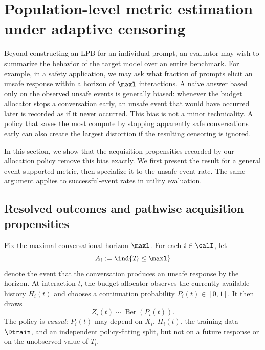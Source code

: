 
\section{Population-level metric estimation under adaptive censoring}
\label{sec:unbiased_estimation}

Beyond constructing an LPB for an individual prompt, an evaluator may wish to
summarize the behavior of the target model over an entire benchmark.  For
example, in a safety application, we may ask what fraction of prompts elicit
an unsafe response within a horizon of $\maxl$ interactions.  A naive answer
based only on the observed unsafe events is generally biased: whenever the
budget allocator stops a conversation early, an unsafe event that would have
occurred later is recorded as if it never occurred.  This bias is not a
minor technicality.  A policy that saves the most compute by stopping
apparently safe conversations early can also create the largest distortion if
the resulting censoring is ignored.

In this section, we show that the acquisition propensities recorded by our
allocation policy remove this bias exactly.  We first present the result for a
general event-supported metric, then specialize it to the unsafe event rate.
The same argument applies to successful-event rates in utility evaluation.

\subsection{Resolved outcomes and pathwise acquisition propensities}

Fix the maximal conversational horizon $\maxl$.  For each $i\in\calI$, let
\begin{equation}
    A_i := \ind{T_i\leq \maxl}
\end{equation}
denote the event that the conversation produces an unsafe response by the
horizon.  At interaction $t$, the budget allocator observes the currently
available history $H_i(t)$ and chooses a continuation probability
$P_i(t)\in[0,1]$.  It then draws
\begin{equation}
    Z_i(t)\sim\operatorname{Ber}(P_i(t)).
\end{equation}
The policy is \emph{causal}: $P_i(t)$ may depend on $X_i$, $H_i(t)$, the
training data $\Dtrain$, and an independent policy-fitting split, but not on a
future response or on the unobserved value of $T_i$.

